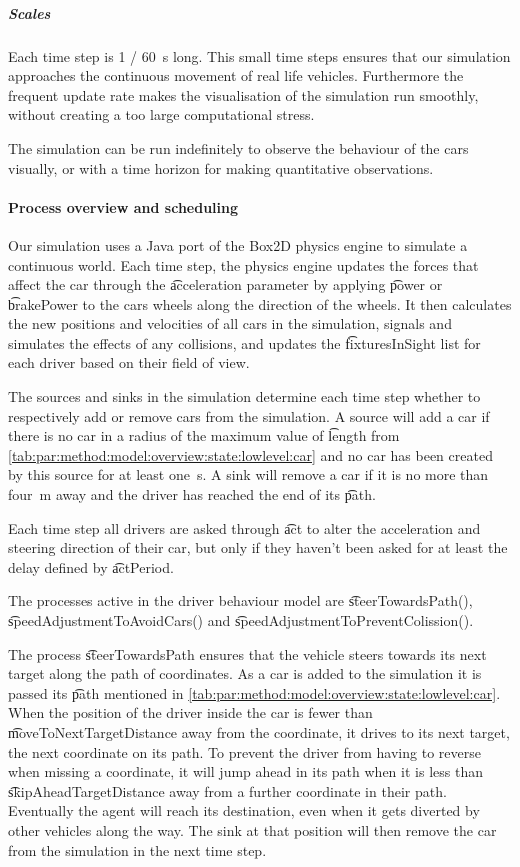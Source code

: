 \subparagraph{Scales}
Each time step is \SI{1 / 60}{\second} long. This small time steps ensures that our simulation approaches the continuous movement of real life vehicles. Furthermore the frequent update rate makes the visualisation of the simulation run smoothly, without creating a too large computational stress.

The simulation can be run indefinitely to observe the behaviour of the cars visually, or with a time horizon for making quantitative observations.

\paragraph{Process overview and scheduling}
\label{par:method:model:overview:process}
Our simulation uses a Java port of the Box2D physics engine to simulate a continuous world. Each time step, the physics engine updates the forces that affect the car through the \t{acceleration} parameter by applying \t{power} or \t{brakePower} to the cars wheels along the direction of the wheels. It then calculates the new positions and velocities of all cars in the simulation, signals and simulates the effects of any collisions, and updates the \t{fixturesInSight} list for each driver based on their field of view.

The sources and sinks in the simulation determine each time step whether to respectively add or remove cars from the simulation. A source will add a car if there is no car in a radius of the maximum value of \t{length} from \cref{tab:par:method:model:overview:state:lowlevel:car} and no car has been created by this source for at least \si{one \second}. A sink will remove a car if it is no more than \si{four \meter} away and the driver has reached the end of its \t{path}.

Each time step all drivers are asked through \t{act} to alter the acceleration and steering direction of their car, but only if they haven't been asked for at least the delay defined by \t{actPeriod}.

\begin{sloppypar}
The processes active in the driver behaviour model are \t{steerTowardsPath()}, \t{speedAdjustmentToAvoidCars()} and \t{speedAdjustmentToPreventColission()}.
\end{sloppypar}

The process \t{steerTowardsPath} ensures that the vehicle steers towards its next target along the path of coordinates. As a car is added to the simulation it is passed its \t{path} mentioned in \cref{tab:par:method:model:overview:state:lowlevel:car}. When the position of the driver inside the car is fewer than \t{moveToNextTargetDistance} away from the coordinate, it drives to its next target, the next coordinate on its path. To prevent the driver from having to reverse when missing a coordinate, it will jump ahead in its path when it is less than \t{skipAheadTargetDistance} away from a further coordinate in their path. Eventually the agent will reach its destination, even when it gets diverted by other vehicles along the way. The sink at that position will then remove the car from the simulation in the next time step.

